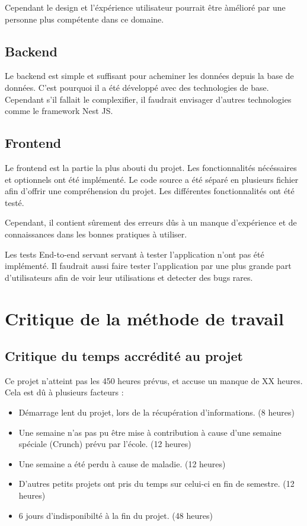 \documentclass[
    iai, %
    il, %
]{heig-tb}
\begin{document}
Cependant le design et l'éxpérience utilisateur pourrait être àmélioré par une personne plus compétente dans ce domaine.

\subsection{Backend}
Le backend est simple et suffisant pour acheminer les données depuis la base de données.
C'est pourquoi il a été développé avec des technologies de base.
Cependant s'il fallait le complexifier, il faudrait envisager d'autres technologies comme le framework Nest JS.

\subsection{Frontend}
Le frontend est la partie la plus abouti du projet.
Les fonctionnalités nécéssaires et optionnels ont été implémenté.
Le code source a été séparé en plusieurs fichier afin d'offrir une compréhension du projet.
Les différentes fonctionnalités ont été testé.

Cependant, il contient sûrement des erreurs dûs à un manque d'expérience et de connaissances dans les bonnes pratiques à utiliser.

Les tests End-to-end servant servant à tester l'application n'ont pas été implémenté.
Il faudrait aussi faire tester l'application par une plus grande part d'utilisateurs afin de voir leur utilisations et detecter des bugs rares.

\section{Critique de la méthode de travail}

\subsection{Critique du temps accrédité au projet}
Ce projet n'atteint pas les 450 heures prévus, et accuse un manque de XX heures.
Cela est dû à plusieurs facteurs :

\begin{itemize}
    \item Démarrage lent du projet, lors de la récupération d'informations.  (8 heures)
    \item Une semaine n'as pas pu être mise à contribution à cause d'une semaine spéciale (Crunch) prévu par l'école. (12 heures)
    \item Une semaine a été perdu à cause de maladie. (12 heures)
    \item D'autres petits projets ont pris du temps sur celui-ci en fin de semestre. (12 heures)
    \item 6 jours d'indisponibilté à la fin du projet. (48 heures)
\end{itemize}
\end{document}
